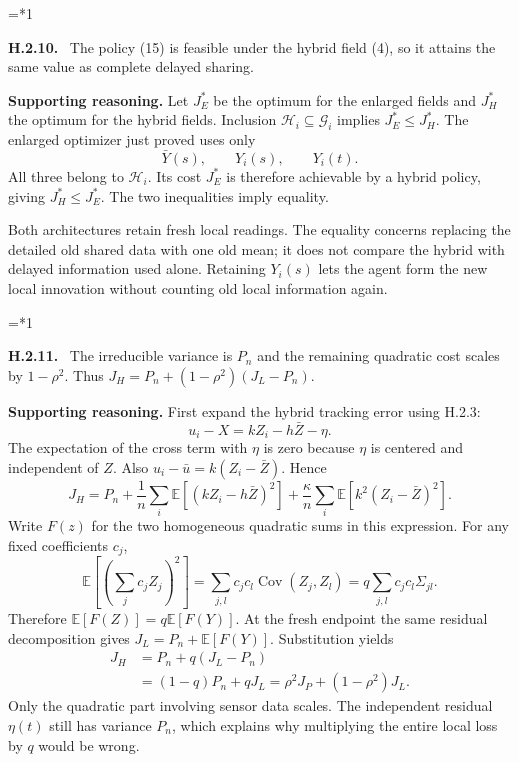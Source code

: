 \documentclass[12pt,letterpaper]{article}
\newcommand{\E}{\mathbb E}
\newcommand{\Cov}{\operatorname{Cov}}
\newcommand{\G}{\mathcal G}
\newcommand{\HH}{\mathcal H}
\newenvironment{proofstep}[2]{%
  \begin{list}{}{\leftmargin=\dimexpr 0.17in*#2\relax%
  \setlength{\rightmargin}{0pt}\setlength{\topsep}{5pt}\setlength{\parsep}{2pt}}%
  \item[]\textbf{\textcolor{ink}{#1.}}\ }{\end{list}}
\begin{document}
\begin{proofstep}{H.2.10}{1}
\label{step:H.2.10}
The policy (15) is feasible under the hybrid field (4), so it attains the same value as complete delayed sharing.

\textbf{Supporting reasoning.}
Let $J_E^*$ be the optimum for the enlarged fields and $J_H^*$ the optimum for the hybrid fields. Inclusion $\HH_i\subseteq\G_i$ implies $J_E^*\le J_H^*$. The enlarged optimizer just proved uses only
\[
\bar Y(s),\qquad Y_i(s),\qquad Y_i(t).
\]
All three belong to $\HH_i$. Its cost $J_E^*$ is therefore achievable by a hybrid policy, giving $J_H^*\le J_E^*$. The two inequalities imply equality.

Both architectures retain fresh local readings. The equality concerns replacing the detailed old shared data with one old mean; it does not compare the hybrid with delayed information used alone. Retaining $Y_i(s)$ lets the agent form the new local innovation without counting old local information again.
\par{}
\end{proofstep}

\begin{proofstep}{H.2.11}{1}
\label{step:H.2.11}
The irreducible variance is $P_n$ and the remaining quadratic cost scales by $1-\rho^2$. Thus $J_H=P_n+(1-\rho^2)(J_L-P_n)$.

\textbf{Supporting reasoning.}
First expand the hybrid tracking error using H.2.3:
\[
u_i-X=kZ_i-h\bar Z-\eta.
\]
The expectation of the cross term with $\eta$ is zero because $\eta$ is centered and independent of $Z$. Also $u_i-\bar u=k(Z_i-\bar Z)$. Hence
\[
J_H=P_n+\frac1n\sum_i\E[(kZ_i-h\bar Z)^2]
+\frac\kappa n\sum_i\E[k^2(Z_i-\bar Z)^2].
\]
Write $F(z)$ for the two homogeneous quadratic sums in this expression. For any fixed coefficients $c_j$,
\[
\E[(\sum_jc_jZ_j)^2]=\sum_{j,l}c_jc_l\Cov(Z_j,Z_l)
=q\sum_{j,l}c_jc_l\Sigma_{jl}.
\]
Therefore $\E[F(Z)]=q\E[F(Y)]$. At the fresh endpoint the same residual decomposition gives $J_L=P_n+\E[F(Y)]$. Substitution yields
\begin{align*}
J_H&=P_n+q(J_L-P_n)\\
&=(1-q)P_n+qJ_L=\rho^2J_P+(1-\rho^2)J_L.
\end{align*}
Only the quadratic part involving sensor data scales. The independent residual $\eta(t)$ still has variance $P_n$, which explains why multiplying the entire local loss by $q$ would be wrong.
\par{}
\end{proofstep}
\end{document}
